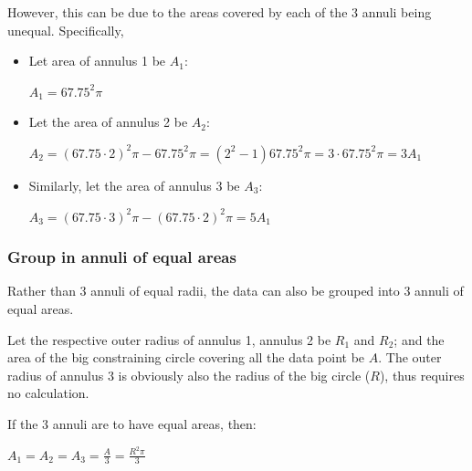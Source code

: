\documentclass[a4paper,12pt]{article}
\begin{document}
    However, this can be due to the areas covered by each of the 3 annuli being unequal. Specifically,

    \begin{itemize}
        \item Let area of annulus 1 be $A_1$:
        \begin{center}
            $A_1 = 67.75^2\pi$
        \end{center}
        \item Let the area of annulus 2 be $A_2$:
        \begin{center}
            $A_2=(67.75\cdot2)^2\pi-67.75^2\pi =(2^2-1)67.75^2\pi =3\cdot 67.75^2\pi=3A_1$
        \end{center}
        \item Similarly, let the area of annulus 3 be $A_3$:
        \begin{center}
            $A_3=(67.75\cdot3)^2\pi-(67.75\cdot2)^2\pi =5A_1$
        \end{center}
    \end{itemize}
    \subsubsection{Group in annuli of equal areas}

    Rather than 3 annuli of equal radii, the data can also be grouped into 3 annuli of equal areas.

    Let the respective outer radius of annulus 1, annulus 2 be $R_1$ and $R_2$; and the area of the big constraining circle covering all the data point be $A$. The outer radius of annulus 3 is obviously also the radius of the big circle ($R$), thus requires no calculation.

    If the 3 annuli are to have equal areas, then:

    \begin{center}
        $A_1=A_2=A_3=\frac{A}{3}=\frac{R^2\pi}{3}$
    \end{center}
\end{document}
